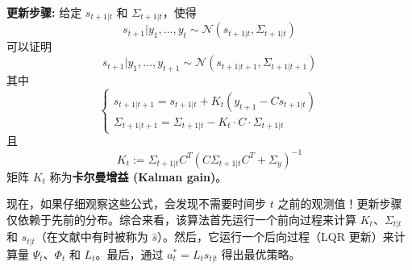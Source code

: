 \noindent\textbf{更新步骤:} 给定 $s_{t+1|t}$ 和 $\Sigma_{t+1|t}$，使得
\[
    s_{t+1}|y_1, \dots, y_t \sim \mathcal{N}(s_{t+1|t}, \Sigma_{t+1|t})
\]
可以证明
\[
    s_{t+1}|y_1, \dots, y_{t+1} \sim \mathcal{N}(s_{t+1|t+1}, \Sigma_{t+1|t+1})
\]
其中
\[
    \begin{cases}
        s_{t+1|t+1} = s_{t+1|t} + K_t(y_{t+1} - C s_{t+1|t}) \\
        \Sigma_{t+1|t+1} = \Sigma_{t+1|t} - K_t \cdot C \cdot \Sigma_{t+1|t}
    \end{cases}
\]
且
\[
    K_t := \Sigma_{t+1|t} C^T (C \Sigma_{t+1|t} C^T + \Sigma_y)^{-1}
\]
矩阵 $K_t$ 称为\textbf{卡尔曼增益 (Kalman gain)}。

现在，如果仔细观察这些公式，会发现不需要时间步 $t$ 之前的观测值！更新步骤仅依赖于先前的分布。综合来看，该算法首先运行一个前向过程来计算 $K_t$、$\Sigma_{t|t}$ 和 $s_{t|t}$（在文献中有时被称为 $\hat{s}$）。然后，它运行一个后向过程（LQR 更新）来计算量 $\Psi_t$、$\Phi_t$ 和 $L_t$。最后，通过 $a_t^* = L_t s_{t|t}$ 得出最优策略。